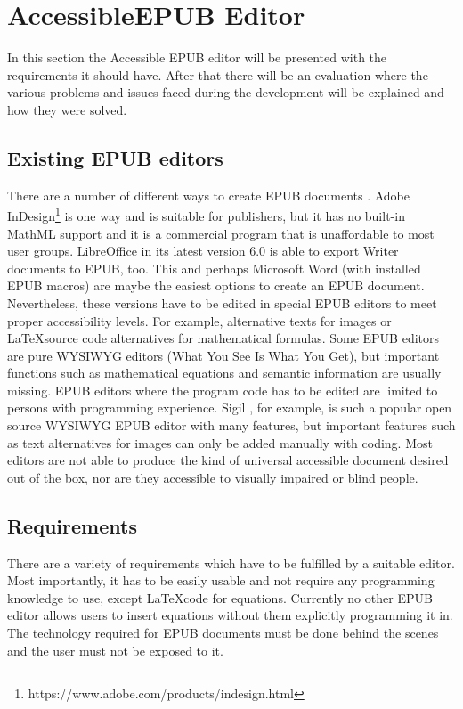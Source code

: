 \chapter{AccessibleEPUB Editor}
\label{ch:AccessibleEPUB Editor}

In this section the Accessible EPUB editor will be presented with the requirements it should have. After that there will be an evaluation where the various problems and issues faced during the development will be explained and how they were solved.

\section{Existing EPUB editors}
\label{ch:exEPUB}
There are a number of different ways to create EPUB documents \cite{EPUBprograms}. Adobe InDesign\footnote{https://www.adobe.com/products/indesign.html} is one way and is suitable for publishers, but it has no built-in MathML support and it is a commercial program that is unaffordable to most user groups. LibreOffice in its latest version 6.0 is able to export Writer documents to EPUB, too. This and perhaps Microsoft Word (with installed EPUB macros) are maybe the easiest options to create an EPUB document. Nevertheless, these versions have to be edited in special EPUB editors to meet proper accessibility levels. For example, alternative texts for images or \LaTeX source code alternatives for mathematical formulas.
Some EPUB editors are pure WYSIWYG editors (What You See Is What You Get), but important functions such as mathematical equations and semantic information are usually missing. EPUB editors where the program code has to be edited are limited to persons with programming experience. Sigil \cite{Sigil}, for example, is such a popular open source WYSIWYG EPUB editor with many features, but important features such as text alternatives for images can only be added manually with coding.
Most editors are not able to produce the kind of universal accessible document desired out of the box, nor are they accessible to visually impaired or blind people. 

\section{Requirements}

There are a variety of requirements which have to be fulfilled by a suitable editor. Most importantly, it has to be easily usable and not require any programming knowledge to use, except \LaTeX code for equations. Currently no other EPUB editor allows users to insert equations without them explicitly programming it in. The technology required for EPUB documents must be done behind the scenes and the user must not be exposed to it. 

